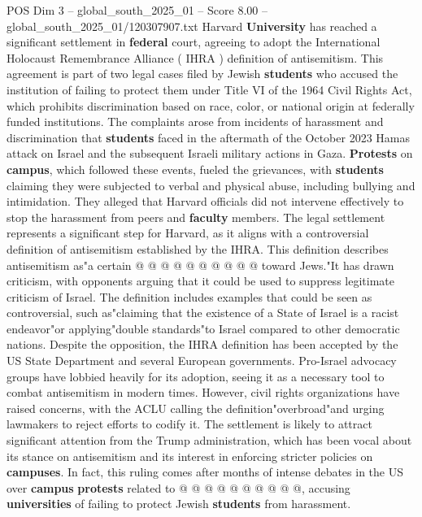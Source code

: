 \begin{textsample}{POS Dim 3 – global\_south\_2025\_01 – Score 8.00 – global\_south\_2025\_01/120307907.txt}  \label{ex:f3_pos_386}
Harvard \textbf{University} has reached a significant settlement in \textbf{federal} court, agreeing to adopt the International Holocaust Remembrance Alliance ( IHRA ) definition of antisemitism.
This agreement is part of two legal cases filed by Jewish \textbf{students} who accused the institution of failing to protect them under Title VI of the 1964 Civil Rights Act, which prohibits discrimination based on race, color, or national origin at federally funded institutions.
The complaints arose from incidents of harassment and discrimination that \textbf{students} faced in the aftermath of the October 2023 Hamas attack on Israel and the subsequent Israeli military actions in Gaza. \textbf{Protests} on \textbf{campus}, which followed these events, fueled the grievances, with \textbf{students} claiming they were subjected to verbal and physical abuse, including bullying and intimidation.
They alleged that Harvard officials did not intervene effectively to stop the harassment from peers and \textbf{faculty} members.
The legal settlement represents a significant step for Harvard, as it aligns with a controversial definition of antisemitism established by the IHRA.
This definition describes antisemitism as"a certain @ @ @ @ @ @ @ @ @ @ toward Jews."It has drawn criticism, with opponents arguing that it could be used to suppress legitimate criticism of Israel.
The definition includes examples that could be seen as controversial, such as"claiming that the existence of a State of Israel is a racist endeavor"or applying"double standards"to Israel compared to other democratic nations.
Despite the opposition, the IHRA definition has been accepted by the US State Department and several European governments.
Pro-Israel advocacy groups have lobbied heavily for its adoption, seeing it as a necessary tool to combat antisemitism in modern times.
However, civil rights organizations have raised concerns, with the ACLU calling the definition"overbroad"and urging lawmakers to reject efforts to codify it.
The settlement is likely to attract significant attention from the Trump administration, which has been vocal about its stance on antisemitism and its interest in enforcing stricter policies on \textbf{campuses}.
In fact, this ruling comes after months of intense debates in the US over \textbf{campus} \textbf{protests} related to @ @ @ @ @ @ @ @ @ @, accusing \textbf{universities} of failing to protect Jewish \textbf{students} from harassment.

\end{textsample}
